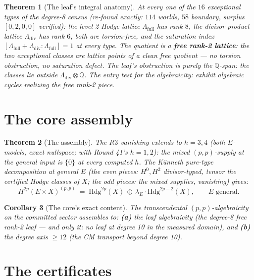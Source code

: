 \documentclass[11pt]{article}
\newtheorem{theorem}{Theorem}
\newtheorem{corollary}[theorem]{Corollary}
\newcommand{\Q}{\mathbb{Q}}
\begin{document}
\begin{theorem}[The leaf's integral anatomy]
At every one of the $16$ exceptional types of the degree-8 census (re-found
exactly: $114$ worlds, $58$ boundary, surplus $[0,2,0,0]$ verified): the
level-2 Hodge lattice $\Lambda_{\mathrm{full}}$ has rank $8$, the
divisor-product lattice $\Lambda_{\mathrm{div}}$ has rank $6$, both are
torsion-free, and the saturation index
$[\Lambda_{\mathrm{full}} + \Lambda_{\mathrm{div}} :
\Lambda_{\mathrm{full}}] = 1$ at every type. The quotient is a
\textbf{free rank-2 lattice}: the two exceptional classes are lattice points
of a clean free quotient --- no torsion obstruction, no saturation defect.
The leaf's obstruction is purely the $\Q$-span: the classes lie outside
$\Lambda_{\mathrm{div}} \otimes \Q$. The entry test for the algebraicity:
exhibit algebraic cycles realizing the free rank-2 piece.
\end{theorem}

\section{The core assembly}

\begin{theorem}[The assembly]
The $R3$ vanishing extends to $h = 3, 4$ (both $E$-models, exact nullspace;
with Round 41's $h = 1, 2$): the mixed $(p,p)$-supply at the general input
is $\{0\}$ at every computed $h$. The K\"unneth pure-type decomposition at
general $E$ (the even pieces: $H^0, H^2$ divisor-typed, tensor the certified
Hodge classes of $X$; the odd pieces: the mixed supplies, vanishing) gives:
\[
H^{2p}(E \times X)^{(p,p)} \;=\;
\mathrm{Hdg}^{2p}(X) \,\oplus\, \lambda_E \cdot \mathrm{Hdg}^{2p-2}(X),
\qquad E \text{ general}.
\]
\end{theorem}

\begin{corollary}[The core's exact content]
The transcendental $(p,p)$-algebraicity on the committed sector assembles
to: \textbf{(a)} the leaf algebraicity (the degree-8 free rank-2 leaf ---
and only it: no leaf at degree 10 in the measured domain), and
\textbf{(b)} the degree axis $\ge 12$ (the CM transport beyond degree 10).
\end{corollary}

\section{The certificates}
\end{document}
